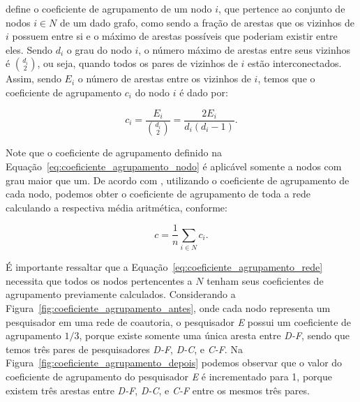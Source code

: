 \cite{Figueiredo2011} define o coeficiente de agrupamento de um nodo $i$, que pertence ao conjunto de nodos $i \in N$ 
de um dado grafo, como sendo a fração de arestas que os vizinhos de $i$ possuem entre si e o máximo de arestas possíveis 
que poderiam existir entre eles. Sendo $d_i$ o grau do nodo $i$, o número máximo de arestas entre seus vizinhos é 
$\binom{d_i}{2}$, ou seja, quando todos os pares de vizinhos de $i$ estão interconectados. Assim, sendo $E_i$ o número de arestas 
entre os vizinhos de $i$, temos que o coeficiente de agrupamento $c_i$ do nodo $i$ é dado por:

\begin{equation}
\label{eq:coeficiente_agrupamento_nodo}
c_i = \frac{E_i}{\binom{d_i}{2}} = \frac{2E_i}{d_i(d_i-1)} .
\end{equation}

Note que o coeficiente de agrupamento definido na Equação~\ref{eq:coeficiente_agrupamento_nodo} é aplicável somente a nodos 
com grau maior que um. De acordo com \cite{Figueiredo2011}, utilizando o coeficiente de agrupamento de cada nodo, podemos 
obter o coeficiente de agrupamento de toda a rede calculando a respectiva média aritmética, conforme:

\begin{equation}
\label{eq:coeficiente_agrupamento_rede}
\textit{\=c} = \frac{1}{n}\sum_{i \in N}{c_i} .
\end{equation}

É importante ressaltar que a Equação~\ref{eq:coeficiente_agrupamento_rede} necessita que todos os nodos pertencentes a $N$ 
tenham seus coeficientes de agrupamento previamente calculados. Considerando a Figura~\ref{fig:coeficiente_agrupamento_antes}, onde cada nodo representa um pesquisador em uma rede de coautoria,
o pesquisador \textit{E} possui um coeficiente de agrupamento $1/3$, porque existe somente uma única aresta entre \textit{D-F}, sendo que temos três pares de pesquisadores 
\textit{D-F}, \textit{D-C}, e \textit{C-F}. Na Figura~\ref{fig:coeficiente_agrupamento_depois} podemos observar que o valor do coeficiente de agrupamento 
do pesquisador \textit{E} é incrementado para 1, porque existem três arestas entre \textit{D-F}, \textit{D-C}, e \textit{C-F} entre os 
mesmos três pares.

